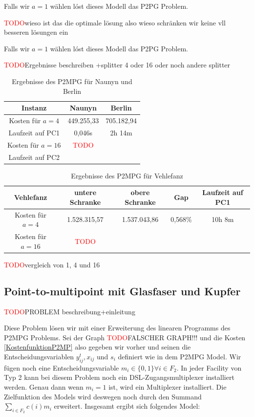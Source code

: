 \documentclass[11pt,a4paper]{article}
\newcommand{\TODO}{\textcolor{red}{TODO}}
\theoremstyle{my_th_style1}
\begin{document}
  Falls wir $a=1$ w\"ahlen l\'ost dieses  Modell das P2PG Problem.
  
 \TODO wieso ist das die optimale lösung also wieso schränken wir keine vll besseren 
 lösungen ein
 
  Falls wir $a=1$ w\"ahlen l\'ost dieses  Modell das P2PG Problem.
 
 \TODO Ergebnisse beschreiben +splitter 4 oder 16 oder noch andere splitter
 \begin{table}[h]
 	\centering
 	\begin{tabular}{c|c|c}
 		Instanz & Naunyn & Berlin \\	
 		\hline
 		 Kosten für $a=4$ & 449.255,33 & 705.182,94 \\
 		 Laufzeit auf PC1 & 0,046s & 2h 14m \\
 		 \hline
 		Kosten für $a=16$ & \TODO & \\
 		Laufzeit auf PC2 &  & \\
 	\end{tabular}
 	\label{P2MPG}
 	\caption{Ergebnisse des P2MPG f\"ur Naunyn und Berlin} 
 \end{table}
 
 \begin{table}[h]
 	\centering
 	\begin{tabular}{c|c|c|c|c}
 		Vehlefanz & untere Schranke & obere Schranke & Gap & Laufzeit auf PC1\\	
 		\hline
 		 Kosten für $a=4$ & 1.528.315,57 & 1.537.043,86 & 0,568\% & 10h 8m\\
 		 \hline
 		Kosten für $a=16$ & \TODO &  & &  \\
 	\end{tabular}
 	\label{P2MPG}
 	\caption{Ergebnisse des P2MPG f\"ur Vehlefanz} 
 \end{table}
 \TODO vergleich von 1, 4 und 16 
 
 \subsection{Point-to-multipoint mit Glasfaser und Kupfer}
\TODO PROBLEM beschreibung+einleitung

Diese Problem lösen wir mit einer Erweiterung des linearen Programms des P2MPG Problems. Sei der Graph \TODO FALSCHER GRAPH!!! und die Kosten \eqref{KostenfunktionP2MP} also gegeben wir vorher und  seinen die Entscheidungsvariablen $y_{ij}^t,x_{ij}$ und $s_i$ definiert wie in dem P2MPG Model. Wir fügen noch eine Entscheidungsvariable $m_i \in \{0,1\} \forall i \in F_2$. In jeder Facility von Typ 2 kann bei diesem Problem noch ein DSL-Zugangsmultiplexer installiert werden. Genau dann wenn $m_i=1$ ist, wird ein Multiplexer installiert. Die Zielfunktion des Models wird deswegen noch durch den Summand $\displaystyle\sum_{i \in F_2} c(i) m_i$ erweitert. Insgesamt ergibt sich folgendes Model:
\end{document}
